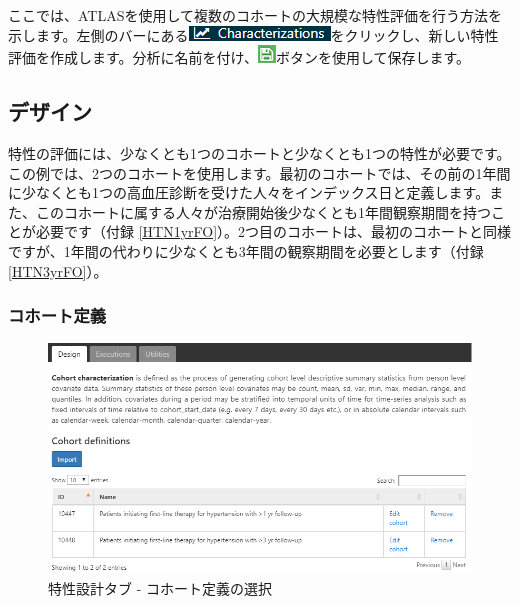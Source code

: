 \documentclass[
  11pt]{book}
\theoremstyle{definition}
\theoremstyle{definition}
\theoremstyle{definition}
\theoremstyle{definition}
\theoremstyle{remark}
\begin{document}
ここでは、ATLASを使用して複数のコホートの大規模な特性評価を行う方法を示します。左側のバーにある\includegraphics{images/Characterization/atlasCharacterizationMenuItem.png}をクリックし、新しい特性評価を作成します。分析に名前を付け、\includegraphics{images/PopulationLevelEstimation/save.png}ボタンを使用して保存します。

\subsection{デザイン}\label{ux30c7ux30b6ux30a4ux30f3}

特性の評価には、少なくとも1つのコホートと少なくとも1つの特性が必要です。この例では、2つのコホートを使用します。最初のコホートでは、その前の1年間に少なくとも1つの高血圧診断を受けた人々をインデックス日と定義します。また、このコホートに属する人々が治療開始後少なくとも1年間観察期間を持つことが必要です（付録 \ref{HTN1yrFO}）。2つ目のコホートは、最初のコホートと同様ですが、1年間の代わりに少なくとも3年間の観察期間を必要とします（付録 \ref{HTN3yrFO}）。

\subsubsection*{コホート定義}\label{ux30b3ux30dbux30fcux30c8ux5b9aux7fa9}

\begin{figure}

{\centering \includegraphics[width=1\linewidth]{images/Characterization/atlasCharacterizationCohortSelection} 

}

\caption{特性設計タブ - コホート定義の選択}\label{fig:atlasCharacterizationCohortSelection}
\end{figure}
\end{document}
